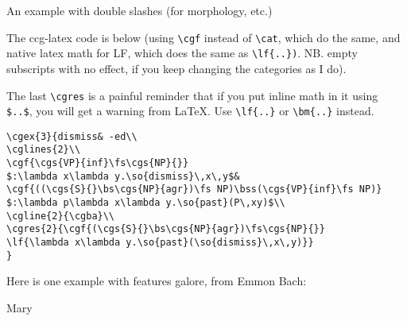 \documentclass[11pt]{article}
\begin{document}
An example with double slashes (for morphology, etc.)\bigskip

\bigskip

The ccg-latex code is below (using \verb|\cgf| instead of \verb|\cat|, which do the same, and native latex math for LF, which does the  same as \verb|\lf{..})|. NB. empty subscripts with no effect, if you keep changing the categories as I do).

The last \verb|\cgres| is a painful reminder that if you put inline math
in it using \verb|$..$|, you will get a warning from \LaTeX. Use \verb|\lf{..}| or \verb|\bm{..}|  instead.\medskip

\begin{verbatim}
\cgex{3}{dismiss& -ed\\
\cglines{2}\\
\cgf{\cgs{VP}{inf}\fs\cgs{NP}{}}
$:\lambda x\lambda y.\so{dismiss}\,x\,y$&
\cgf{((\cgs{S}{}\bs\cgs{NP}{agr})\fs NP)\bss(\cgs{VP}{inf}\fs NP)}
$:\lambda p\lambda x\lambda y.\so{past}(P\,xy)$\\
\cgline{2}{\cgba}\\
\cgres{2}{\cgf{(\cgs{S}{}\bs\cgs{NP}{agr})\fs\cgs{NP}{}}
\lf{\lambda x\lambda y.\so{past}(\so{dismiss}\,x\,y)}}
}
\end{verbatim}
\newpage

Here is one example with features galore, from Emmon Bach:\bigskip

{\footnotesize
Mary }\bigskip
\end{document}
